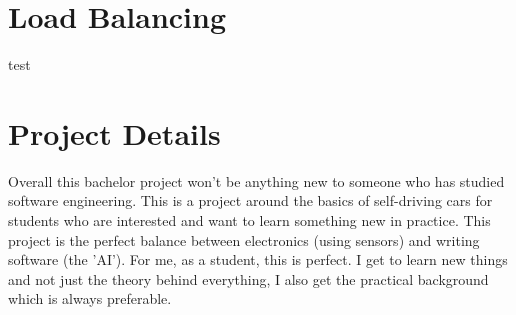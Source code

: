 \documentclass[a4paper,notitlepage]{article}
\begin{document}
\section*{Load Balancing}

test

\section*{Project Details}

Overall this bachelor project won't be anything new to someone who has studied software engineering. This is a project around the basics of self-driving cars for students who are interested and want to learn something new in practice. This project is the perfect balance between electronics (using sensors) and writing software (the 'AI'). For me, as a student, this is perfect. I get to learn new things and not just the theory behind everything, I also get the practical background which is always preferable.

 {}

\end{document}
